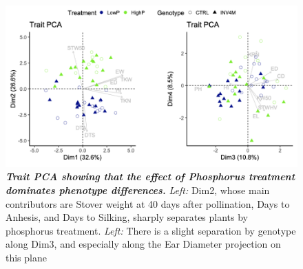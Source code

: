 \begin{figure}[!ht]

\includegraphics[width=\linewidth]{Chapter-3/figs/traitPCA.png}
\caption[Trait PCA showing that the effect of Phosphorus treatment dominates phenotype differences.]{\textbf{\textit{Trait PCA showing that the effect of Phosphorus treatment dominates phenotype differences.}}
\textit{Left:} Dim2, whose main contributors are Stover weight at 40 days after pollination, Days to Anhesis, and Days to Silking, sharply separates plants by phosphorus treatment. \textit{Left:} There is a slight separation by \textit{\invfour} genotype along Dim3, and especially along the Ear Diameter projection on this plane}
\label{fig::traitPCA}
\end{figure}

